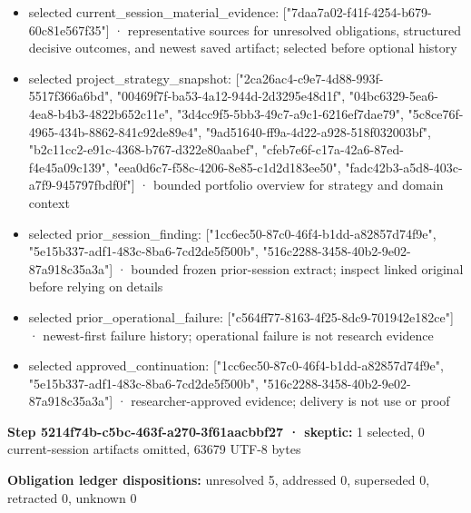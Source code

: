 \documentclass[11pt]{article}
\begin{document}
\begin{itemize}
\item selected current\_session\_material\_evidence: ["7daa7a02-f41f-4254-b679-60c81e567f35"] · representative sources for unresolved obligations, structured decisive outcomes, and newest saved artifact; selected before optional history
\item selected project\_strategy\_snapshot: ["2ca26ac4-c9e7-4d88-993f-5517f366a6bd", "00469f7f-ba53-4a12-944d-2d3295e48d1f", "04bc6329-5ea6-4ea8-b4b3-4822b652c11e", "3d4cc9f5-5bb3-49c7-a9c1-6216ef7dae79", "5c8ce76f-4965-434b-8862-841c92de89e4", "9ad51640-ff9a-4d22-a928-518f032003bf", "b2c11cc2-e91c-4368-b767-d322e80aabef", "cfeb7e6f-c17a-42a6-87ed-f4e45a09c139", "eea0d6c7-f58c-4206-8e85-c1d2d183ee50", "fadc42b3-a5d8-403c-a7f9-945797fbdf0f"] · bounded portfolio overview for strategy and domain context
\item selected prior\_session\_finding: ["1cc6ec50-87c0-46f4-b1dd-a82857d74f9e", "5e15b337-adf1-483c-8ba6-7cd2de5f500b", "516c2288-3458-40b2-9e02-87a918c35a3a"] · bounded frozen prior-session extract; inspect linked original before relying on details
\item selected prior\_operational\_failure: ["c564ff77-8163-4f25-8dc9-701942e182ce"] · newest-first failure history; operational failure is not research evidence
\item selected approved\_continuation: ["1cc6ec50-87c0-46f4-b1dd-a82857d74f9e", "5e15b337-adf1-483c-8ba6-7cd2de5f500b", "516c2288-3458-40b2-9e02-87a918c35a3a"] · researcher-approved evidence; delivery is not use or proof
\end{itemize}
\textbf{Step 5214f74b-c5bc-463f-a270-3f61aacbbf27 · skeptic:} 1 selected, 0 current-session artifacts omitted, 63679 UTF-8 bytes\par
\textbf{Obligation ledger dispositions:} unresolved 5, addressed 0, superseded 0, retracted 0, unknown 0\par
\end{document}
